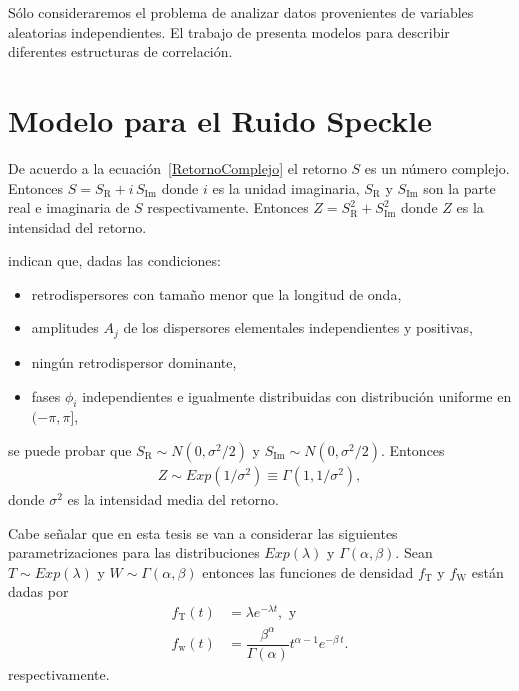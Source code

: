 Sólo consideraremos el problema de analizar datos provenientes de variables aleatorias independientes.
El trabajo de \citet{AGeneralizedGaussianCoherentScattererModelforCorrelatedSARTexture} presenta modelos para describir diferentes estructuras de correlación.


\section{Modelo para el Ruido Speckle}
\label{ModeloSpeckle}

De acuerdo a la ecuación~\eqref{RetornoComplejo} el retorno $S$ es un número complejo. Entonces $S=S_{\text{R}}+i \, S_{\text{Im}}$ donde $i$ es la unidad imaginaria, $S_{\text{R}}$ y $S_{\text{Im}}$ son la parte real e imaginaria de $S$ respectivamente. Entonces $Z=S_{\text{R}}^2+S_{\text{Im}}^2$ donde $Z$ es la intensidad del retorno. 

 \citet{FreryLibro2019} indican que, dadas las condiciones:
\begin{itemize}
	\item retrodispersores con tamaño menor que la longitud de onda,
	\item amplitudes $A_j$ de los dispersores elementales independientes y positivas,
	\item ningún retrodispersor dominante, 
	\item fases $\phi_i$ independientes e igualmente distribuidas con distribución uniforme en $(-\pi,\pi]$,
\end{itemize}   
se puede probar que $S_{\text{R}} \sim N(0,\sigma^2/2)$ y $S_{\text{Im}} \sim N(0,\sigma^2/2)$. Entonces
\begin{align}
\label{DistRetornoExp}
	Z \sim Exp(1/\sigma^2) \equiv \Gamma(1,1/\sigma^2),
\end{align}
donde $\sigma^2$ es la intensidad media del retorno.

Cabe señalar que en esta tesis se van a considerar las siguientes parametrizaciones para las distribuciones $Exp(\lambda)$ y $\Gamma(\alpha,\beta)$. Sean $T \sim Exp(\lambda)$ y $W \sim \Gamma(\alpha,\beta)$ entonces las funciones de densidad $f_{\text{T}}$ y $f_{\text{W}}$ están dadas por
\begin{align}
f_{\text{T}}(t)&=\lambda e^{-\lambda t}, \text{ y}\label{DistExponencial}\\
f_{\text{w}}(t)&=\dfrac{\beta^{\alpha}}{\Gamma(\alpha)} t^{\alpha-1} e^{-\beta \, t}.\label{DistGamma}
\end{align}
respectivamente.  


